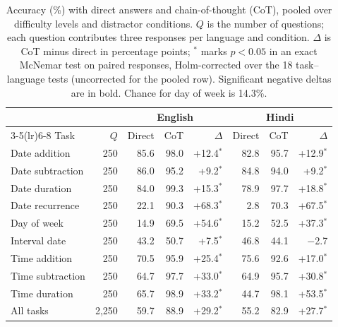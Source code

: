 \begin{table}[t]
\centering
\begin{tabular}{lrrrrrrr}
\toprule
 & & \multicolumn{3}{c}{English} & \multicolumn{3}{c}{Hindi} \\
\cmidrule(lr){3-5}\cmidrule(lr){6-8}
Task & $Q$ & Direct & CoT & $\Delta$ & Direct & CoT & $\Delta$ \\
\midrule
Date addition & 250 & 85.6 & 98.0 & +12.4$^{*}$ & 82.8 & 95.7 & +12.9$^{*}$ \\
Date subtraction & 250 & 86.0 & 95.2 & +9.2$^{*}$ & 84.8 & 94.0 & +9.2$^{*}$ \\
Date duration & 250 & 84.0 & 99.3 & +15.3$^{*}$ & 78.9 & 97.7 & +18.8$^{*}$ \\
Date recurrence & 250 & 22.1 & 90.3 & +68.3$^{*}$ & 2.8 & 70.3 & +67.5$^{*}$ \\
Day of week & 250 & 14.9 & 69.5 & +54.6$^{*}$ & 15.2 & 52.5 & +37.3$^{*}$ \\
Interval date & 250 & 43.2 & 50.7 & +7.5$^{*}$ & 46.8 & 44.1 & $-$2.7\phantom{$^{*}$} \\
Time addition & 250 & 70.5 & 95.9 & +25.4$^{*}$ & 75.6 & 92.6 & +17.0$^{*}$ \\
Time subtraction & 250 & 64.7 & 97.7 & +33.0$^{*}$ & 64.9 & 95.7 & +30.8$^{*}$ \\
Time duration & 250 & 65.7 & 98.9 & +33.2$^{*}$ & 44.7 & 98.1 & +53.5$^{*}$ \\
\midrule
All tasks & 2,250 & 59.7 & 88.9 & +29.2$^{*}$ & 55.2 & 82.9 & +27.7$^{*}$ \\
\bottomrule
\end{tabular}
\caption{Accuracy (\%) with direct answers and chain-of-thought (CoT), pooled over difficulty levels and distractor conditions. $Q$ is the number of questions; each question contributes three responses per language and condition. $\Delta$ is CoT minus direct in percentage points; $^{*}$ marks $p<0.05$ in an exact McNemar test on paired responses, Holm-corrected over the 18 task--language tests (uncorrected for the pooled row). Significant negative deltas are in bold. Chance for day of week is 14.3\%.}
\label{tab:cot-delta}
\end{table}

